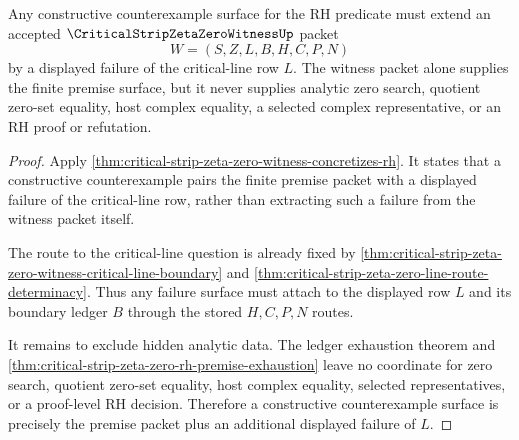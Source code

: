 \begin{theorem}
\label{thm:critical-strip-zeta-zero-constructive-counterexample-surface}
Any constructive counterexample surface for the RH predicate must extend an accepted $\CriticalStripZetaZeroWitnessUp$ packet
$$
W=(S,Z,L,B,H,C,P,N)
$$
by a displayed failure of the critical-line row $L$. The witness packet alone supplies the finite premise surface, but it never supplies analytic zero search, quotient zero-set equality, host complex equality, a selected complex representative, or an RH proof or refutation.
\end{theorem}
\begin{proof}
Apply \autoref{thm:critical-strip-zeta-zero-witness-concretizes-rh}. It states that a constructive counterexample pairs the finite premise packet with a displayed failure of the critical-line row, rather than extracting such a failure from the witness packet itself.

The route to the critical-line question is already fixed by \autoref{thm:critical-strip-zeta-zero-witness-critical-line-boundary} and \autoref{thm:critical-strip-zeta-zero-line-route-determinacy}. Thus any failure surface must attach to the displayed row $L$ and its boundary ledger $B$ through the stored $H,C,P,N$ routes.

It remains to exclude hidden analytic data. The ledger exhaustion theorem and \autoref{thm:critical-strip-zeta-zero-rh-premise-exhaustion} leave no coordinate for zero search, quotient zero-set equality, host complex equality, selected representatives, or a proof-level RH decision. Therefore a constructive counterexample surface is precisely the premise packet plus an additional displayed failure of $L$.
\end{proof}

